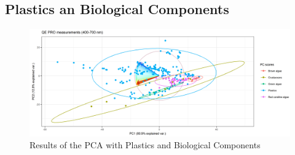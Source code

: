 \begin{appendices}
\section{Plastics an Biological Components}
\begin{figure}[H]
    \centering
    \includegraphics[width=1\textwidth]{Images/results/PCA_plastics_and_biology_scat_clust.png}
    \caption[PCA Plastics and Biological Pigments]{Results of the PCA with Plastics and Biological Components}
\end{figure}



\end{appendices}
